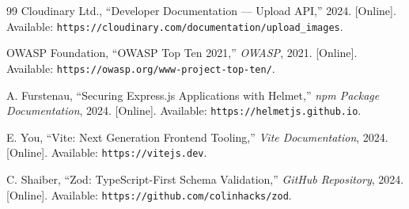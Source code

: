 \documentclass[12pt,a4paper]{report}
\begin{document}
\begin{thebibliography}{99}
Cloudinary Ltd., ``Developer Documentation — Upload API,'' 2024. [Online]. Available: \texttt{https://cloudinary.com/documentation/upload\_images}.

OWASP Foundation, ``OWASP Top Ten 2021,'' \textit{OWASP}, 2021. [Online]. Available: \texttt{https://owasp.org/www-project-top-ten/}.

A. Furstenau, ``Securing Express.js Applications with Helmet,'' \textit{npm Package Documentation}, 2024. [Online]. Available: \texttt{https://helmetjs.github.io}.

E. You, ``Vite: Next Generation Frontend Tooling,'' \textit{Vite Documentation}, 2024. [Online]. Available: \texttt{https://vitejs.dev}.

C. Shaiber, ``Zod: TypeScript-First Schema Validation,'' \textit{GitHub Repository}, 2024. [Online]. Available: \texttt{https://github.com/colinhacks/zod}.

\end{thebibliography}
\end{document}
